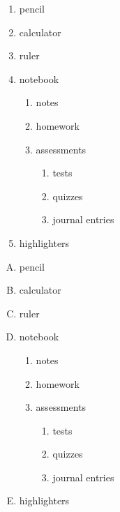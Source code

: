 \documentclass[11pt]{article}
\begin{document}
\begin{enumerate}
\item pencil
\item calculator
\item ruler
\item notebook
    \begin{enumerate}
        \item notes
        \item homework
        \item assessments
            \begin{enumerate}
                \item tests
                \item quizzes
                \item journal entries
            \end{enumerate}
    \end{enumerate}
\item highlighters
\end{enumerate}

\vspace{1cm}

\begin{enumerate}[A.]
\item pencil
\item calculator
\item ruler
\item notebook
    \begin{enumerate}
        \item notes
        \item homework
        \item assessments
            \begin{enumerate}
                \item tests
                \item quizzes
                \item journal entries
            \end{enumerate}
    \end{enumerate}
\item highlighters
\end{enumerate}

\vspace{1cm}
\end{document}
